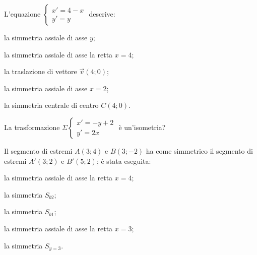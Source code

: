 \begin{esercizio}
\label{ese:8.87} %
L'equazione $\begin{cases}x'=4-x\\y'=y\end{cases}$ descrive: 
\begin{enumeratea}
\item la simmetria assiale di asse $y$;
\item la simmetria assiale di asse la retta $x=4$;
\item la traslazione di vettore $\vec{v}(4;0)$;
\item la simmetria assiale di asse $x=2$;
\item la simmetria centrale di centro $C(4;0)$.
\end{enumeratea}
\end{esercizio}

\begin{esercizio}
\label{ese:8.88} %
La trasformazione $\Sigma \begin{cases}x'=-y+2\\y'=2x\end{cases}$ è un'isometria?
\end{esercizio}

\begin{esercizio}
\label{ese:8.89} %
Il segmento di estremi $A(3;4)$ e $B(3;-2)$ ha come simmetrico il segmento di estremi $A'(3;2)$ e $B'(5;2)$; è stata eseguita:
\begin{enumeratea}
\item la simmetria assiale di asse la retta $x=4$;
\item la simmetria $S_{b2}$;
\item la simmetria $S_{b1}$;
\item la simmetria assiale di asse la retta $x=3$;
\item la simmetria $S_{y=3}$.
\end{enumeratea}
\end{esercizio}

